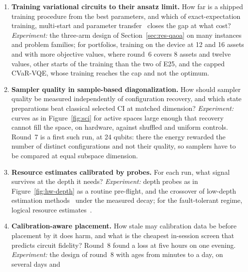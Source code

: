 \documentclass[11pt,a4paper]{article}
\begin{document}
\begin{enumerate}
        one-hot encoding, and can capacity be encoded so that the QUBO
        optimum is the problem's optimum? The mission QUBO leaves the duty
        limit to repair in the same way, and a QAOA on it was better on the
        QUBO and not on the problem; whether a mixer that keeps the rules
        changes that is open.
  \item \textbf{Training variational circuits to their ansatz limit.} How far
        is a shipped training procedure from the best parameters, and which
        of exact-expectation training, multi-start and parameter
        transfer~\cite{shaydulin2023,sureshbabu2024} closes the gap at what
        cost? \emph{Experiment:} the three-arm design of
        Section~\ref{sec:res-qaoa} on many instances and problem families;
        for portfolios, training on the device at 12 and 16 assets and with
        more objective values, where round~6 covers 8 assets and twelve
        values, other starts of the training than the two of E25,
        and the capped CVaR-VQE, whose training
        reaches the cap and not the optimum.
  \item \textbf{Sampler quality in sample-based diagonalization.} How should
        sampler quality be measured independently of configuration recovery,
        and which state preparations beat classical selected CI at matched
        dimension? \emph{Experiment:} curves as in Figure~\ref{fig:sci} for
        active spaces large enough that recovery cannot fill the space, on
        hardware, against shuffled and uniform controls. Round~7 is a first
        such run, at 24 qubits: there the energy rewarded the number of
        distinct configurations and not their quality, so samplers have to
        be compared at equal subspace dimension.
  \item \textbf{Resource estimates calibrated by probes.} For each run, what
        signal survives at the depth it needs? \emph{Experiment:} depth
        probes as in Figure~\ref{fig:hw-depth} as a routine pre-flight, and
        the crossover of low-depth estimation
        methods~\cite{giurgica2022} under the measured decay; for the
        fault-tolerant regime, logical resource estimates~\cite{beverland2022}.
  \item \textbf{Calibration-aware placement.} How stale may calibration data
        be before placement by it does harm, and what is the cheapest
        in-session screen that predicts circuit fidelity? Round~8 found a
        loss at five hours on one evening. \emph{Experiment:} the design of
        round~8 with ages from minutes to a day, on several days and

\end{enumerate}
\end{document}
